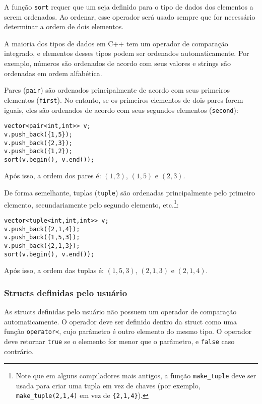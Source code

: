 
A função \texttt{sort} requer que um  seja definido para o tipo de dados
dos elementos a serem ordenados.
Ao ordenar, esse operador será usado sempre que for necessário determinar a ordem de dois elementos.

A maioria dos tipos de dados em C++ tem um operador de comparação integrado, e elementos desses tipos podem ser ordenados automaticamente. Por exemplo, números são ordenados de acordo com seus valores e strings são ordenadas em ordem alfabética.


Pares (\texttt{pair}) são ordenados principalmente de acordo com seus primeiros elementos (\texttt{first}).
No entanto, se os primeiros elementos de dois pares forem iguais, eles são ordenados de acordo com seus segundos elementos (\texttt{second}):
\begin{lstlisting}
vector<pair<int,int>> v;
v.push_back({1,5});
v.push_back({2,3});
v.push_back({1,2});
sort(v.begin(), v.end());
\end{lstlisting}
Após isso, a ordem dos pares é:
$(1,2)$, $(1,5)$ e $(2,3)$.


De forma semelhante, tuplas (\texttt{tuple})
são ordenadas principalmente pelo primeiro elemento,
secundariamente pelo segundo elemento, etc.\footnote{Note que em alguns compiladores mais antigos, a função \texttt{make\_tuple} deve ser usada para criar uma tupla em vez de chaves (por exemplo, \texttt{make\_tuple(2,1,4)} em vez de \texttt{\{2,1,4\}}).}:
\begin{lstlisting}
vector<tuple<int,int,int>> v;
v.push_back({2,1,4});
v.push_back({1,5,3});
v.push_back({2,1,3});
sort(v.begin(), v.end());
\end{lstlisting}
Após isso, a ordem das tuplas é:
$(1,5,3)$, $(2,1,3)$ e $(2,1,4)$.

\subsubsection{Structs definidas pelo usuário}

As structs definidas pelo usuário não possuem um operador de comparação automaticamente.
O operador deve ser definido dentro da struct como uma função
\texttt{operator<},
cujo parâmetro é outro elemento do mesmo tipo.
O operador deve retornar \texttt{true}
se o elemento for menor que o parâmetro,
e \texttt{false} caso contrário.

